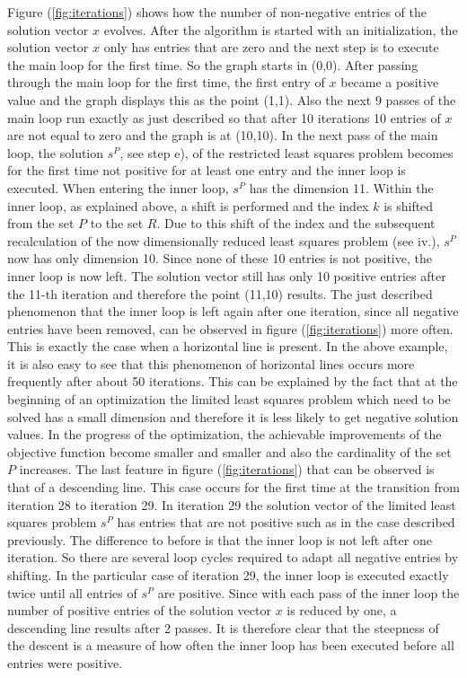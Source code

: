Figure (\ref{fig:iterations}) shows how the number of non-negative entries of the solution vector $x$ evolves. After the algorithm is started with an initialization, the solution vector $x$ only has entries that are zero and the next step is to execute the main loop for the first time. So the graph starts in (0,0). After passing through the main loop for the first time, the first entry of $x$ became a positive value and the graph displays this as the point (1,1). Also the next 9 passes of the main loop run exactly as just described so that after 10 iterations 10 entries of $x$ are not equal to zero and the graph is at (10,10). In the next pass of the main loop, the solution $s^P$, see step e), of the restricted least squares problem becomes for the first time not positive for at least one entry and the inner loop is executed. When entering the inner loop, $s^P$ has the dimension 11. Within the inner loop, as explained above, a shift is performed and the index $k$ is shifted from the set $P$ to the set $R$. Due to this shift of the index and the subsequent recalculation of the now dimensionally reduced least squares problem (see iv.), $s^P$ now has only dimension 10. Since none of these 10 entries is not positive, the inner loop is now left. The solution vector still has only 10 positive entries after the 11-th iteration and therefore the point (11,10) results. The just described phenomenon that the inner loop is left again after one iteration, since all negative entries have been removed, can be observed in figure (\ref{fig:iterations}) more often. This is exactly the case when a horizontal line is present. In the above example, it is also easy to see that this phenomenon of horizontal lines occurs more frequently after about 50 iterations. This can be explained by the fact that at the beginning of an optimization the limited least squares problem which need to be solved has a small dimension and therefore it is less likely to get negative solution values. In the progress of the optimization, the achievable improvements of the objective function become smaller and smaller and also the cardinality of the set $P$ increases. The last feature in figure (\ref{fig:iterations}) that can be observed is that of a descending line. This case occurs for the first time at the transition from iteration 28 to iteration 29. In iteration 29 the solution vector of the limited least squares problem $s^P$ has entries that are not positive such as in the case described previously. The difference to before is that the inner loop is not left after one iteration. So there are several loop cycles required to adapt all negative entries by shifting. In the particular case of iteration 29, the inner loop is executed exactly twice until all entries of $s^P$ are positive. Since with each pass of the inner loop the number of positive entries of the solution vector $x$ is reduced by one, a descending line results after 2 passes. It is therefore clear that the steepness of the descent is a measure of how often the inner loop has been executed before all entries were positive. 


